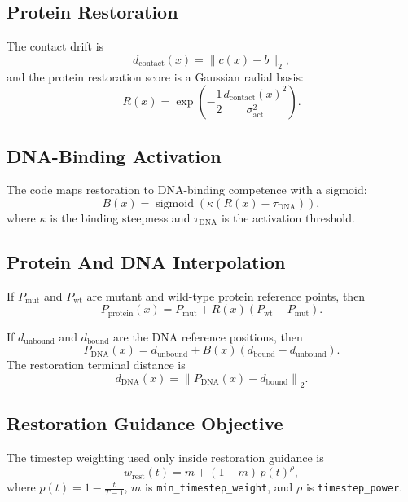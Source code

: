 \documentclass[11pt]{article}
\newcommand{\sigmoid}{\operatorname{sigmoid}}
\begin{document}
\subsection{Protein Restoration}
The contact drift is
\begin{equation}
d_{\mathrm{contact}}(x) = \|c(x) - b\|_2,
\end{equation}
and the protein restoration score is a Gaussian radial basis:
\begin{equation}
R(x)
=
\exp\!\left(
-\frac{1}{2}
\frac{d_{\mathrm{contact}}(x)^2}{\sigma_{\mathrm{act}}^2}
\right).
\end{equation}

\subsection{DNA-Binding Activation}
The code maps restoration to DNA-binding competence with a sigmoid:
\begin{equation}
B(x)
=
\sigmoid\!\left(
\kappa\left(R(x) - \tau_{\mathrm{DNA}}\right)
\right),
\end{equation}
where $\kappa$ is the binding steepness and $\tau_{\mathrm{DNA}}$ is the activation threshold.

\subsection{Protein And DNA Interpolation}
If $P_{\mathrm{mut}}$ and $P_{\mathrm{wt}}$ are mutant and wild-type protein reference points, then
\begin{equation}
P_{\mathrm{protein}}(x)
=
P_{\mathrm{mut}} + R(x)\left(P_{\mathrm{wt}} - P_{\mathrm{mut}}\right).
\end{equation}

If $d_{\mathrm{unbound}}$ and $d_{\mathrm{bound}}$ are the DNA reference positions, then
\begin{equation}
P_{\mathrm{DNA}}(x)
=
d_{\mathrm{unbound}} + B(x)\left(d_{\mathrm{bound}} - d_{\mathrm{unbound}}\right).
\end{equation}
The restoration terminal distance is
\begin{equation}
d_{\mathrm{DNA}}(x)
=
\left\|
P_{\mathrm{DNA}}(x) - d_{\mathrm{bound}}
\right\|_2.
\end{equation}

\subsection{Restoration Guidance Objective}
The timestep weighting used only inside restoration guidance is
\begin{equation}
w_{\mathrm{rest}}(t)
=
m + (1-m)\,p(t)^\rho,
\end{equation}
where $p(t)=1-\frac{t}{T-1}$, $m$ is \texttt{min\_timestep\_weight}, and $\rho$ is \texttt{timestep\_power}.
\end{document}
